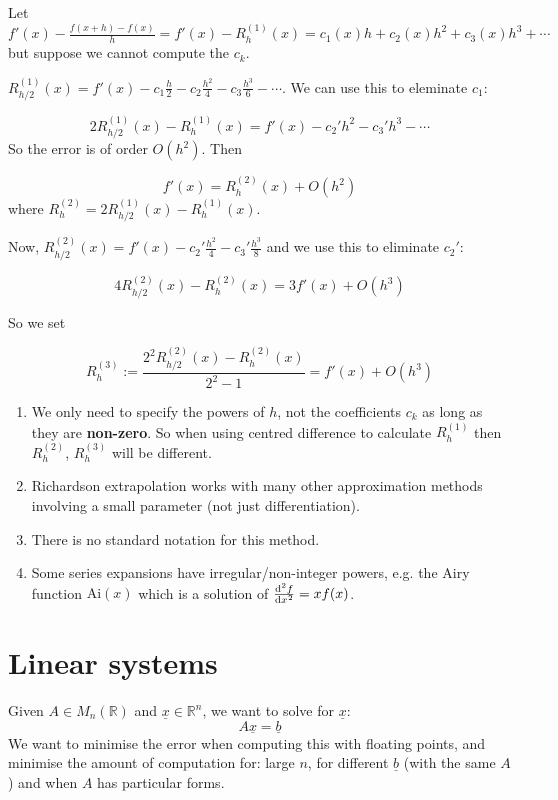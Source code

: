 Let $f'(x) - \frac{f(x + h) - f(x)}{h} = f'(x) - R_h^{(1)} (x) = c_1(x) h + c_2(x) h^2 + c_3(x) h^3 + \cdots$ but suppose we cannot compute the $c_k$.

$R_{h / 2}^{(1)} (x) = f'(x) - c_1 \frac{h}{2} - c_2 \frac{h^2}{4} - c_3 \frac{h^3}{6} - \cdots$. We can use this to eleminate $c_1$:

\[ 2 R_{h / 2}^{(1)} (x) - R_h^{(1)} (x) = f'(x) - c_2' h^2 - c_3' h^3 - \cdots \]
So the error is of order $O(h^2)$. Then

\[ f'(x) = R_h^{(2)} (x) + O(h^2) \]
where $R_h^{(2)} = 2 R_{h / 2}^{(1)} (x) - R_h^{(1)} (x)$.

Now, $R_{h / 2}^{(2)} (x) = f'(x) - c_2' \frac{h^2}{4} - c_3' \frac{h^3}{8}$ and we use this to eliminate $c_2'$:

\[ 4 R_{h / 2}^{(2)} (x) - R_h^{(2)} (x) = 3 f'(x) + O(h^3) \]

So we set

\[ R_h^{(3)} := \frac{2^2 R_{h / 2}^{(2)} (x) - R_h^{(2)}(x)}{2^2 - 1} = f'(x) + O(h^3) \]

\begin{remark}
	\hfill
	\begin{enumerate}
		\item We only need to specify the powers of $h$, not the coefficients $c_k$ as long as they are \textbf{non-zero}. So when using centred difference to calculate $R_h^{(1)}$ then $R_h^{(2)}$, $R_h^{(3)}$ will be different.
		\item Richardson extrapolation works with many other approximation methods involving a small parameter (not just differentiation).
		\item There is no standard notation for this method.
		\item Some series expansions have irregular/non-integer powers, e.g. the Airy function $\text{Ai}(x)$ which is a solution of $\diff[2]{f}{x} = x f(x)$.
	\end{enumerate}
\end{remark}

\section{Linear systems}

Given $A \in M_n(\mathbb{R})$ and $\underline{x} \in \mathbb{R}^n$, we want to solve for $\underline{x}$:
\[
	A \underline{x} = \underline{b}
\]
We want to minimise the error when computing this with floating points, and minimise the amount of computation for: large $n$, for different $\underline{b}$ (with the same $A$) and when $A$ has particular forms.

